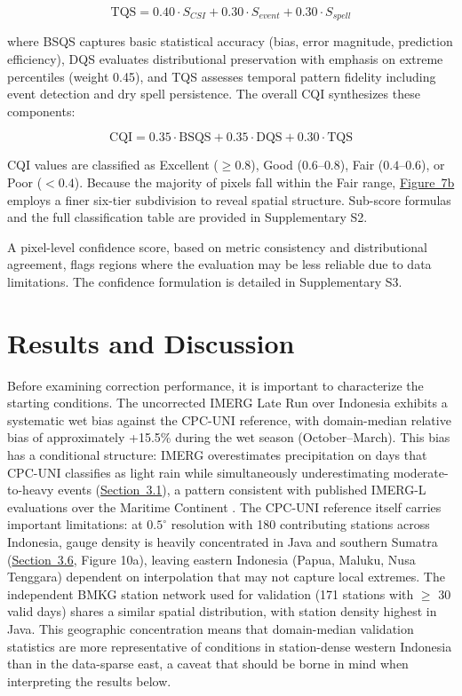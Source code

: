\documentclass[11pt,a4paper]{article}
\begin{document}
\begin{equation}\text{TQS} = 0.40 \cdot S_{CSI} + 0.30 \cdot S_{event} + 0.30 \cdot S_{spell}\end{equation}

where BSQS captures basic statistical accuracy (bias, error magnitude, prediction efficiency), DQS evaluates distributional preservation with emphasis on extreme percentiles (weight 0.45), and TQS assesses temporal pattern fidelity including event detection and dry spell persistence. The overall CQI synthesizes these components:

\begin{equation}\text{CQI} = 0.35 \cdot \text{BSQS} + 0.35 \cdot \text{DQS} + 0.30 \cdot \text{TQS}\end{equation}

CQI values are classified as Excellent (\(\geq 0.8\)), Good (\(0.6\text{--}0.8\)), Fair (\(0.4\text{--}0.6\)), or Poor (\(< 0.4\)). Because the majority of pixels fall within the Fair range, \hyperref[fig7]{Figure~7b} employs a finer six-tier subdivision to reveal spatial structure. Sub-score formulas and the full classification table are provided in Supplementary S2.

A pixel-level confidence score, based on metric consistency and distributional agreement, flags regions where the evaluation may be less reliable due to data limitations. The confidence formulation is detailed in Supplementary S3.

\section{Results and Discussion}\label{results-and-discussion}

Before examining correction performance, it is important to characterize
the starting conditions. The uncorrected IMERG Late Run over Indonesia
exhibits a systematic wet bias against the CPC-UNI reference, with
domain-median relative bias of approximately +15.5\% during the wet season
(October--March). This bias has a conditional structure: IMERG
overestimates precipitation on days that CPC-UNI classifies as light
rain while simultaneously underestimating moderate-to-heavy events
(\hyperref[progressive-improvement]{Section~3.1}), a pattern consistent with published IMERG-L evaluations
over the Maritime Continent \cite{ref31,ref32,ref33}. The CPC-UNI reference itself
carries important limitations: at \(0.5^{\circ}\) resolution with 180
contributing stations across Indonesia, gauge density is heavily
concentrated in Java and southern Sumatra (\hyperref[role-station-density]{Section~3.6}, Figure 10a),
leaving eastern Indonesia (Papua, Maluku, Nusa Tenggara) dependent on
interpolation that may not capture local extremes. The independent BMKG
station network used for validation (171 stations with \(\geq\) 30 valid
days) shares a similar spatial distribution, with station density
highest in Java. This geographic concentration means that domain-median
validation statistics are more representative of conditions in
station-dense western Indonesia than in the data-sparse east, a
caveat that should be borne in mind when interpreting the results below.
\end{document}
